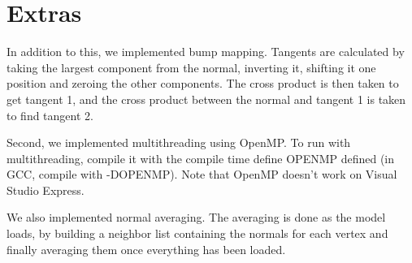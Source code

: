 \documentclass{article} %
\begin{document}
\section{Extras}
In addition to this, we implemented bump mapping. Tangents are calculated by taking the largest component from the normal, inverting it, shifting it one position and zeroing the other components. The cross product is then taken to get tangent 1, and the cross product between the normal and tangent 1 is taken to find tangent 2.

Second, we implemented multithreading using OpenMP. To run with multithreading, compile it with the compile time define OPENMP defined (in GCC, compile with -DOPENMP). Note that OpenMP doesn't work on Visual Studio Express.

We also implemented normal averaging. The averaging is done as the model loads, by building a neighbor list containing the normals for each vertex and finally averaging them once everything has been loaded.
\end{document}

